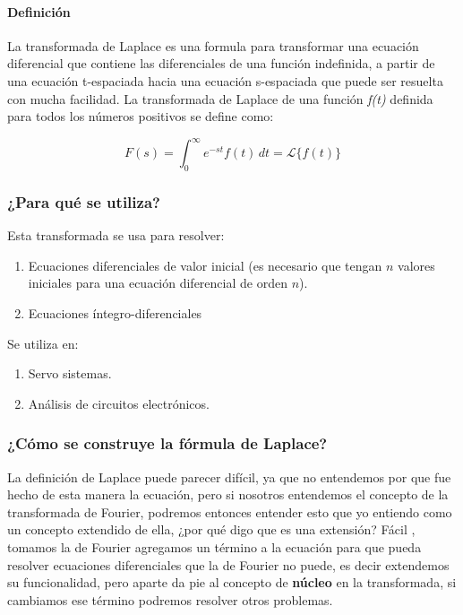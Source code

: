 \paragraph*{Definición}
La transformada de Laplace es una formula para transformar una ecuación
diferencial que contiene las diferenciales de una función indefinida, a partir de una
ecuación t-espaciada hacia una ecuación s-espaciada que puede ser resuelta con mucha facilidad.	
\newline
La transformada de Laplace de una función \textit{f(t)} definida para todos los números positivos se define como:

\[
F(s) = \int_{0}^{\infty} \! e^{-st} f(t)  \,dt = \mathscr{L}\{f(t)\}
\]

\subsubsection{¿Para qué se utiliza?}
\noindent Esta transformada se usa para resolver:
 \begin{enumerate}
	\item Ecuaciones diferenciales de valor inicial (es necesario que tengan $n$ valores iniciales para una ecuación diferencial de orden $n$).
	\item Ecuaciones íntegro-diferenciales
\end{enumerate}

\noindent Se utiliza en:

\begin{enumerate}
	\item Servo sistemas.
	\item Análisis de circuitos electrónicos.
\end{enumerate}

\subsubsection{¿Cómo se construye la fórmula de Laplace?}


La definición de Laplace puede parecer difícil, ya que  no entendemos por que fue hecho de esta manera la ecuación, pero si nosotros entendemos el concepto de la transformada de Fourier, podremos entonces entender esto que yo entiendo como un concepto extendido de ella, ¿por qué digo que es una extensión? Fácil , tomamos la de Fourier  agregamos un término a la ecuación para que pueda resolver ecuaciones diferenciales que la de Fourier no puede, es decir extendemos su funcionalidad, pero aparte da pie al concepto de \textbf{núcleo} en la transformada, si cambiamos ese término podremos resolver otros problemas.

